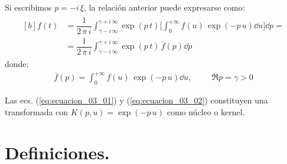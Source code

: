 Si escribimos $p = - i \, \xi$, la relación anterior puede expresarse como:
\begin{align}
\begin{aligned}[b]
f (t) &= \dfrac{1}{2 \, \pi \, i} \int_{\gamma -i \, \infty}^{\gamma + i \, \infty} \exp(p \, t) \bigg[ \int_{0}^{+\infty} f(u) \, \exp(- p \, u) \dd{u} \bigg] \dd{p} = \\[0.5em]
&= \dfrac{1}{2 \, \pi \, i} \int_{\gamma -i \, \infty}^{\gamma + i \, \infty} \exp(p \, t) \, \overline{f} (p) \dd{p} 
\end{aligned}
\label{eq:ecuacion_03_01}
\end{align}
donde:
\begin{align}
\overline{f} (p) = \int_{0}^{+\infty} f(u) \, \exp(- p \, u) \dd{u}, \hspace{1cm} \Re{p} = \gamma > 0
\label{eq:ecuacion_03_02}
\end{align}

Las ecs. (\ref{eq:ecuacion_03_01}) y (\ref{eq:ecuacion_03_02}) constituyen una transformada con $K(p, u) = \exp(- p \, u)$ como núcleo o kernel.

\section{Definiciones.}

